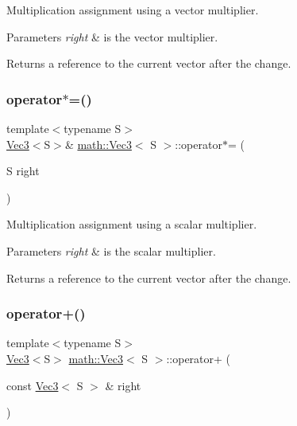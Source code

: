 Multiplication assignment using a vector multiplier.


\begin{DoxyParams}{Parameters}
{\em right} & is the vector multiplier.\\
\hline
\end{DoxyParams}
\begin{DoxyReturn}{Returns}
a reference to the current vector after the change. 
\end{DoxyReturn}
\mbox{\label{classmath_1_1_vec3_af54d3d2a6b077d8b70a8b1b71d9f6212}} 
\subsubsection{\texorpdfstring{operator$\ast$=()}{operator*=()}\hspace{0.1cm}{\footnotesize\ttfamily [2/2]}}
{\footnotesize\ttfamily template$<$typename S$>$ \\
\hyperlink{classmath_1_1_vec3}{Vec3}$<$S$>$\& \hyperlink{classmath_1_1_vec3}{math\+::\+Vec3}$<$ S $>$\+::operator$\ast$= (\begin{DoxyParamCaption}\item[{S}]{right }\end{DoxyParamCaption})\hspace{0.3cm}{\ttfamily [inline]}}

Multiplication assignment using a scalar multiplier.


\begin{DoxyParams}{Parameters}
{\em right} & is the scalar multiplier.\\
\hline
\end{DoxyParams}
\begin{DoxyReturn}{Returns}
a reference to the current vector after the change. 
\end{DoxyReturn}
\mbox{\label{classmath_1_1_vec3_a4b0af91c5c4825772e20568d3a132c2d}} 
\subsubsection{\texorpdfstring{operator+()}{operator+()}}
{\footnotesize\ttfamily template$<$typename S$>$ \\
\hyperlink{classmath_1_1_vec3}{Vec3}$<$S$>$ \hyperlink{classmath_1_1_vec3}{math\+::\+Vec3}$<$ S $>$\+::operator+ (\begin{DoxyParamCaption}\item[{const \hyperlink{classmath_1_1_vec3}{Vec3}$<$ S $>$ \&}]{right }\end{DoxyParamCaption})\hspace{0.3cm}{\ttfamily [inline]}}

